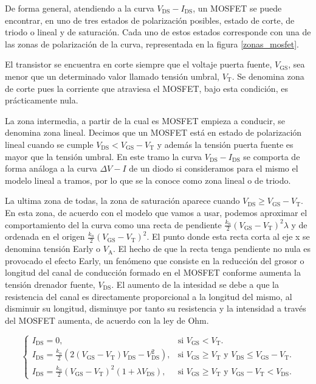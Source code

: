 \documentclass[11pt,a4paper]{article}
\begin{document}
    De forma general, atendiendo a la curva $V_\mathrm{DS}-I_\mathrm{DS}$, un MOSFET se puede encontrar, en uno de tres estados de polarización posibles, estado de corte, de triodo o lineal y de saturaci\'on. Cada uno de estos estados corresponde con una de las zonas de polarización de la curva, representada en la figura \ref{zonas_mosfet}.

		El transistor se encuentra en corte siempre que el voltaje puerta fuente, $V_\mathrm{GS}$, sea menor que un determinado valor llamado tensión umbral, $V_\mathrm{T}$. Se denomina zona de corte pues la corriente que atraviesa el MOSFET, bajo esta condición, es prácticamente nula.

		La zona intermedia, a partir de la cual es MOSFET empieza a conducir, se denomina zona lineal. Decimos que un MOSFET está en estado de polarización lineal cuando se cumple $V_\mathrm{DS}< V_\mathrm{GS}-V_\mathrm{T}$ y además la tensión puerta fuente es mayor que la tensión umbral. En este tramo la curva $V_\mathrm{DS}-I_\mathrm{DS}$ se comporta de forma análoga a la curva $\Delta V-I$ de un diodo si consideramos para el mismo el modelo lineal a tramos, por lo que se la conoce como zona lineal o de triodo.

		La ultima zona de todas, la zona de saturación aparece cuando $V_\mathrm{DS}\geq V_\mathrm{GS}-V_\mathrm{T}$. En esta zona, de acuerdo con el modelo que vamos a usar, podemos aproximar el comportamiento del la curva como una recta de pendiente $\frac{k_n}{2}\left(V_{\mathrm{GS}}-V_{\mathrm{T}}\right)^2\lambda$ y de ordenada en el origen $\frac{k_n}{2}\left(V_{\mathrm{GS}}-V_{\mathrm{T}}\right)^2$. El punto donde esta recta corta al eje x se denomina tensión Early o $V_\mathrm{A}$. El hecho de que la recta tenga pendiente no nula es provocado el efecto Early, un fenómeno que consiste en la reducción del grosor o longitud del canal de conducción formado en el MOSFET conforme aumenta la tensión drenador fuente, $V_\mathrm{DS}$. El aumento de la intesidad se debe a que la resistencia del canal es directamente proporcional a la longitud del mismo, al disminuir su longitud, disminuye por tanto su resistencia y la intensidad a través del MOSFET aumenta, de acuerdo con la ley de Ohm.

    \begin{equation}
			\begin{cases}
			I_{\mathrm{DS}} = 0, & \mbox{si }V_{\mathrm{GS}}< V_{\mathrm{T}}.\\
			I_{\mathrm{DS}} = \frac{k_n}{2}\left(2\left(V_{\mathrm{GS}}-V_{\mathrm{T}}\right)V_{\mathrm{DS}}-V_{\mathrm{DS}}^2\right), & \mbox{si } V_{\mathrm{GS}}\geq V_{\mathrm{T}} \mbox{ y }V_{\mathrm{DS}}\leq V_{\mathrm{GS}}-V_{\mathrm{T}}.\\
			I_{\mathrm{DS}} = \frac{k_n}{2}\left(V_{\mathrm{GS}}-V_{\mathrm{T}}\right)^2\left(1+\lambda V_{\mathrm{DS}}\right), & \mbox{si } V_{\mathrm{GS}}\geq V_{\mathrm{T}} \mbox{ y } V_{\mathrm{GS}}-V_{\mathrm{T}}< V_{\mathrm{DS}}.
			\end{cases}
		\end{equation}
\end{document}
